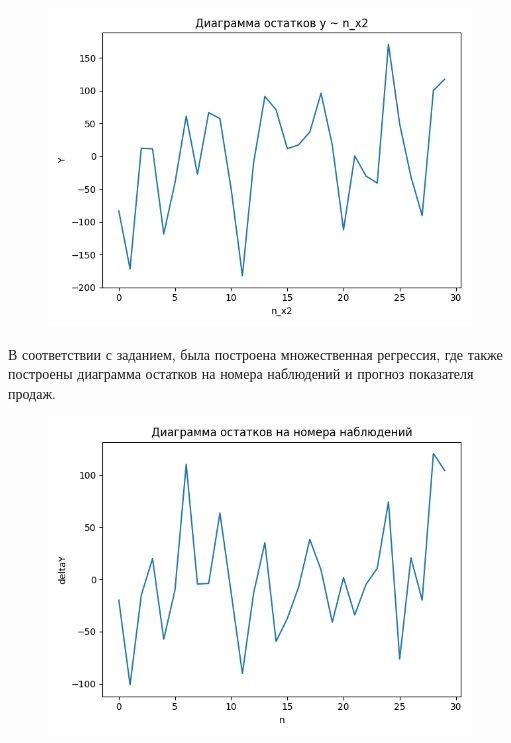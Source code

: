 \begin{figure}[H]
\begin{minipage}[H]{0.32\linewidth}
		\begin{center}
			\includegraphics[width=\linewidth]{figures/res_plot_n_x2}
		\end{center}
	\end{minipage}
\end{figure}

В соответствии с заданием, была построена множественная регрессия, где также построены диаграмма остатков на номера наблюдений и прогноз показателя продаж.

\begin{figure}[H]
	\begin{center}
		\begin{minipage}[H]{0.7\linewidth}
				\includegraphics[width=\linewidth]{figures/res_plot_gen}
		\end{minipage}
	\end{center}
\end{figure}

